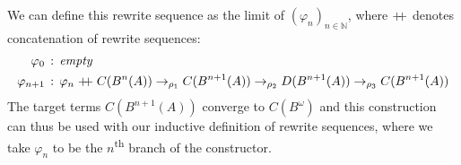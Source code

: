 We can define this rewrite sequence as the limit of
$(\varphi_n)_{n \in \mathbb{N}}$, where $\mathrel{+\!\!+}$ denotes
concatenation of rewrite sequences:
\begin{align*}
  \varphi_0 \, &: \, \mbox{\emph{empty}}\\ %
  \varphi_{n + 1} \, &: \, \varphi_n \concat C(B^n(A)) \to_{\rho_1}
  C(B^{n + 1}(A)) \to_{\rho_2} D(B^{n + 1}(A)) \to_{\rho_3} C(B^{n +
    1}(A))
\end{align*}
The target terms $C(B^{n + 1}(A))$ converge to $C(B^\omega)$ and this
construction can thus be used with our inductive definition of rewrite
sequences, where we take $\varphi_n$ to be the $n$\textsuperscript{th}
branch of the 
constructor.



